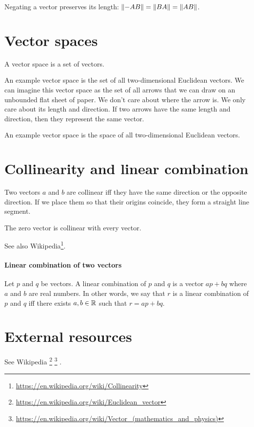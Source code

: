 Negating a vector preserves its length:
\(\norm{-AB} = \norm{BA} = \norm{AB}\).

\section{Vector spaces}

A vector space is a set of vectors.

An example vector space is the set of all two-dimensional Euclidean vectors.
We can imagine this vector space as the set of all arrows that we can draw on an unbounded flat sheet of paper.
We don't care about where the arrow is.
We only care about its length and direction.
If two arrows have the same length and direction,
then they represent the same vector.

An example vector space is the space of all two-dimensional Euclidean vectors.

\section{Collinearity and linear combination}

Two vectors \(a\) and \(b\) are collinear
iff they have the same direction or the opposite direction.
If we place them so that their origins coincide, they form a straight line segment.

The zero vector is collinear with every vector.

See also Wikipedia\footnote{\url{https://en.wikipedia.org/wiki/Collinearity}}.

\paragraph{Linear combination of two vectors}

Let \(p\) and \(q\) be vectors.
A linear combination of \(p\) and \(q\) is a vector \( ap+bq \)
where \(a\) and \(b\) are real numbers.
In other words, we say that \(r\) is a linear combination of \(p\) and \(q\)
iff there exists \(a,b\in \mathbb{R}\) such that \(r = ap+bq\).

\section{External resources}

See Wikipedia%
\footnote{\url{https://en.wikipedia.org/wiki/Euclidean_vector}}%
\footnote{\url{https://en.wikipedia.org/wiki/Vector_(mathematics_and_physics)}}%
.

